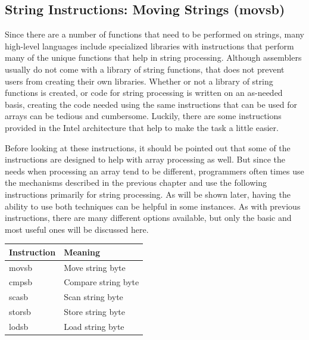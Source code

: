 \documentclass[10pt]{book}
\begin{document}
\subsection{String Instructions: Moving Strings (movsb)}
Since there are a number of functions that need to be performed on strings, many high-level languages include specialized libraries with instructions that perform many of the unique functions that help in string processing. Although assemblers usually do not come with a library of string functions, that does not prevent users from creating their own libraries. Whether or not a library of string functions is created, or code for string processing is written on an as-needed basis, creating the code needed using the same instructions that can be used for arrays can be tedious and cumbersome. Luckily, there are some instructions provided in the Intel architecture that help to make the task a little easier.

Before looking at these instructions, it should be pointed out that some of the instructions are designed to help with array processing as well. But since the needs when processing an array tend to be different, programmers often times use the mechanisms described in the previous chapter and use the following instructions primarily for string processing. As will be shown later, having the ability to use both techniques can be helpful in some instances. As with previous instructions, there are many different options available, but only the basic and most useful ones will be discussed here.

\begin{center}
\begin{tabular}{|l|l|}
\hline
Instruction & Meaning \\
\hline
movsb & Move string byte \\
\hline
cmpsb & Compare string byte \\
\hline
scasb & Scan string byte \\
\hline
storsb & Store string byte \\
\hline
lodsb & Load string byte \\
\hline
\end{tabular}
\end{center}
\end{document}
